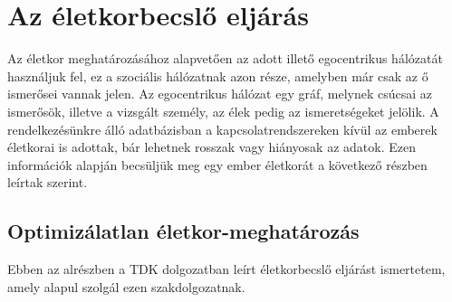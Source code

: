 \documentclass[12pt]{article}
\begin{document}
\section{Az életkorbecslő eljárás}
Az életkor meghatározásához alapvetően az adott illető egocentrikus hálózatát használjuk fel, ez a szociális hálózatnak azon része, amelyben már csak az ő ismerősei vannak jelen. Az egocentrikus hálózat egy gráf, melynek csúcsai az ismerősök, illetve a vizsgált személy, az élek pedig az ismeretségeket jelölik. A rendelkezésünkre álló adatbázisban a kapcsolatrendszereken kívül az emberek életkorai is adottak, bár lehetnek rosszak vagy hiányosak az adatok. Ezen információk alapján becsüljük meg egy ember életkorát a következő részben leírtak szerint.

\subsection{Optimizálatlan életkor-meghatározás} \label{eletkor_becsles_tamas_gabor}
Ebben az alrészben a \cite{tamas_gabor_tdk} TDK dolgozatban leírt életkorbecslő eljárást ismertetem, amely alapul szolgál ezen szakdolgozatnak.
\end{document}
